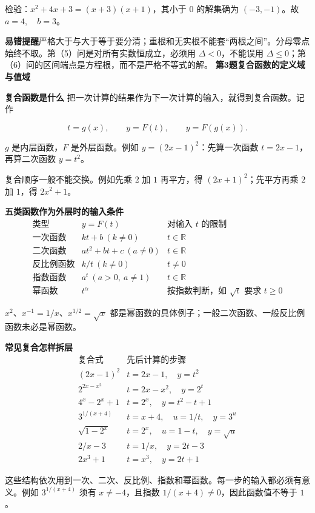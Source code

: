 \documentclass[UTF8,zihao=-4]{ctexart}
\newcommand{\labeltext}[1]{\par\textbf{#1}\quad}
\begin{document}
检验：$x^2+4x+3=(x+3)(x+1)$，其小于 $0$ 的解集确为 $(-3,-1)$。故 $\boxed{a=4,\quad b=3}$。\par
\labeltext{易错提醒}严格大于与大于等于要分清；重根和无实根不能套“两根之间”。分母零点始终不取。第（5）问是对所有实数恒成立，必须用 $\Delta<0$，不能误用 $\Delta\le0$；第（6）问的区间端点是方程根，而不是严格不等式的解。
\clearpage
{\Large\bfseries 第3题\quad 复合函数的定义域与值域}
\labeltext{复合函数是什么}
把一次计算的结果作为下一次计算的输入，就得到复合函数。记作\par
\[t=g(x),\qquad y=F(t),\qquad y=F(g(x)).\]\par
$g$ 是内层函数，$F$ 是外层函数。例如 $y=(2x-1)^2$：先算一次函数 $t=2x-1$，再算二次函数 $y=t^2$。\par
复合顺序一般不能交换。例如先乘 $2$ 加 $1$ 再平方，得 $(2x+1)^2$；先平方再乘 $2$ 加 $1$，得 $2x^2+1$。\par
\labeltext{五类函数作为外层时的输入条件}
\[\begin{array}{c|c|l}\text{类型}&y=F(t)&\text{对输入 }t\text{ 的限制}\\\hline\text{一次函数}&kt+b\ (k\ne0)&t\in\mathbb R\\\text{二次函数}&at^2+bt+c\ (a\ne0)&t\in\mathbb R\\\text{反比例函数}&k/t\ (k\ne0)&t\ne0\\\text{指数函数}&a^t\ (a>0,\ a\ne1)&t\in\mathbb R\\\text{幂函数}&t^\alpha&\text{按指数判断，如 }\sqrt t\text{ 要求 }t\ge0\end{array}\]\par
$x^2$、$x^{-1}=1/x$、$x^{1/2}=\sqrt x$ 都是幂函数的具体例子；一般二次函数、一般反比例函数未必是幂函数。\par
\labeltext{常见复合怎样拆层}
\[\begin{array}{c|l}\text{复合式}&\text{先后计算的步骤}\\\hline(2x-1)^2&t=2x-1,\quad y=t^2\\2^{2x-x^2}&t=2x-x^2,\quad y=2^t\\4^x-2^x+1&t=2^x,\quad y=t^2-t+1\\3^{1/(x+4)}&t=x+4,\quad u=1/t,\quad y=3^u\\\sqrt{1-2^x}&t=2^x,\quad u=1-t,\quad y=\sqrt u\\2/x-3&t=1/x,\quad y=2t-3\\2x^3+1&t=x^3,\quad y=2t+1\end{array}\]\par
这些结构依次用到一次、二次、反比例、指数和幂函数。每一步的输入都必须有意义。例如 $3^{1/(x+4)}$ 须有 $x\ne-4$，且指数 $1/(x+4)\ne0$，因此函数值不等于 $1$。\par
\end{document}
